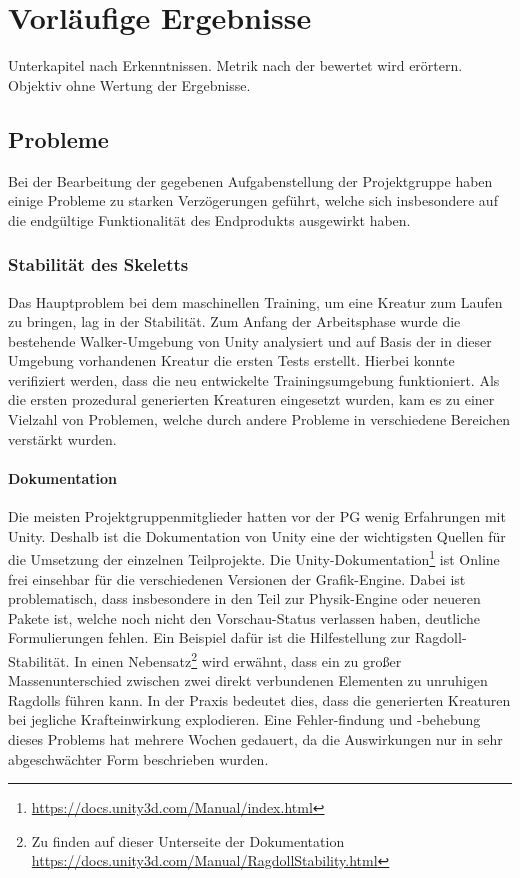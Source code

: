 \chapter{Vorläufige Ergebnisse}
\label{Vorlaeufige_Ergebnisse}

Unterkapitel nach Erkenntnissen. Metrik nach der bewertet wird erörtern. Objektiv ohne Wertung der Ergebnisse.




\section{Probleme}
Bei der Bearbeitung der gegebenen Aufgabenstellung der Projektgruppe haben einige Probleme zu starken Verzögerungen geführt, welche sich insbesondere auf die endgültige Funktionalität des Endprodukts ausgewirkt haben.

\subsection{Stabilität des Skeletts}
Das Hauptproblem bei dem maschinellen Training, um eine Kreatur zum Laufen zu bringen, lag in der Stabilität. Zum Anfang der Arbeitsphase wurde die bestehende Walker-Umgebung von Unity analysiert und auf Basis der in dieser Umgebung vorhandenen Kreatur die ersten Tests erstellt. Hierbei konnte verifiziert werden, dass die neu entwickelte Trainingsumgebung funktioniert. Als die ersten prozedural generierten Kreaturen eingesetzt wurden, kam es zu einer Vielzahl von Problemen, welche durch andere Probleme in verschiedene Bereichen verstärkt wurden.

\subsubsection{Dokumentation} %
Die meisten Projektgruppenmitglieder hatten vor der PG wenig Erfahrungen mit Unity. Deshalb ist die Dokumentation von Unity eine der wichtigsten Quellen für die Umsetzung der einzelnen Teilprojekte. Die Unity-Dokumentation\footnote{\url{https://docs.unity3d.com/Manual/index.html}} ist Online frei einsehbar für die verschiedenen Versionen der Grafik-Engine. Dabei ist problematisch, dass insbesondere in den Teil zur Physik-Engine oder neueren Pakete ist, welche noch nicht den Vorschau-Status verlassen haben, deutliche Formulierungen fehlen. Ein Beispiel dafür ist die Hilfestellung zur Ragdoll-Stabilität. In einen Nebensatz\footnote{Zu finden auf dieser Unterseite der Dokumentation \url{https://docs.unity3d.com/Manual/RagdollStability.html}} wird erwähnt, dass ein zu großer Massenunterschied zwischen zwei direkt verbundenen Elementen zu unruhigen Ragdolls führen kann. In der Praxis bedeutet dies, dass die generierten Kreaturen bei jegliche Krafteinwirkung explodieren. Eine Fehler-findung und -behebung dieses Problems hat mehrere Wochen gedauert, da die Auswirkungen nur in sehr abgeschwächter Form beschrieben wurden.

